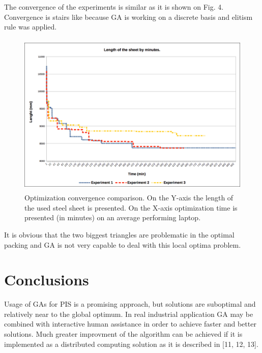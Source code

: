 \documentclass{llncs}
\begin{document}
The convergence of the experiments is similar as it is shown on Fig. 4. Convergence is stairs like because GA is working on a discrete basis and elitism rule was applied.

\begin{figure}
	\centering
	\includegraphics[width=12.62cm,height=7.88cm]{fig05.png}
	\caption{Optimization convergence comparison. On the Y-axis the length of the used steel sheet is presented. On the X-axis optimization time is presented (in minutes) on an average performing laptop.}
	\label{fig:Graph}
\end{figure}
\FloatBarrier
%
It is obvious that the two biggest triangles are problematic in the optimal packing and GA is not very capable to deal with this local optima problem.
%
\section{Conclusions}
%
Usage of GAs for PIS is a promising approach, but solutions are suboptimal and relatively near to the global optimum. In real industrial application GA may be combined with interactive human assistance in order to achieve faster and better solutions. Much greater improvment of the algorithm can be achieved if it is implemented as a distributed computing solution as it is described in [11, 12, 13]. 
%
\end{document}
